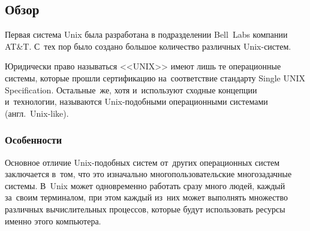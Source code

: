 \documentclass{bmstu}
\begin{document}
\subsection{Обзор}

Первая система Unix была разработана в подразделении Bell~Labs компании AT\&T. С~тех пор было создано большое количество различных Unix-систем.

Юридически право называться <<UNIX>> имеют лишь те операционные системы, которые прошли сертификацию на~соответствие стандарту Single UNIX Specification.
Остальные~же, хотя и~используют сходные концепции и~технологии, называются Unix-подобными операционными системами (англ.~Unix-like).

\subsubsection{Особенности}

Основное отличие Unix-подобных систем от~других операционных систем заключается в~том, что это изначально многопользовательские многозадачные системы.
В~Unix может одновременно работать сразу много людей, каждый за~своим терминалом, при этом каждый из~них может выполнять множество различных вычислительных процессов, которые будут использовать ресурсы именно этого компьютера. \newpage
\end{document}

